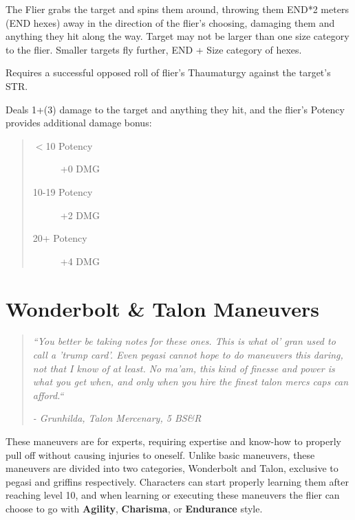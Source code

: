 \documentclass[11pt,a4paper,twocolumn]{book}
\begin{document}
\medskip

The Flier grabs the target and spins them around, throwing them END*2 meters (END hexes) away in the direction of the flier's choosing, damaging them and anything they hit along the way. Target may not be larger than one size category to the flier. Smaller targets fly further, END + Size category of hexes.

Requires a successful opposed roll of flier's Thaumaturgy against the target's STR.

Deals 1+(3) damage to the target and anything they hit, and the flier's Potency provides additional damage bonus:

\begin{quote}
	\begin{description}
		\item[$<$10 Potency] 	+0 DMG
		\item[10-19 Potency] 	+2 DMG
		\item[20+ Potency] 	+4 DMG
	\end{description}
\end{quote}

\vfill



\section*{Wonderbolt \& Talon Maneuvers}
\begin{quote}
	\emph{``You better be taking notes for these ones. This is what ol' gran used to call a 'trump card'. Even pegasi cannot hope to do maneuvers this daring, not that I know of at least. No ma'am, this kind of finesse and power is what you get when, and only when you hire the finest talon mercs caps can afford.``}
	
	\emph{- Grunhilda, Talon Mercenary, 5 BS\&R}
\end{quote}

These maneuvers are for experts, requiring expertise and know-how to properly pull off without causing injuries to oneself. Unlike basic maneuvers, these maneuvers are divided into two categories, Wonderbolt and Talon, exclusive to pegasi and griffins respectively. Characters can start properly learning them after reaching level 10, and when learning or executing these maneuvers the flier can choose to go with \textbf{Agility}, \textbf{Charisma}, or \textbf{Endurance} style.

\end{document}

